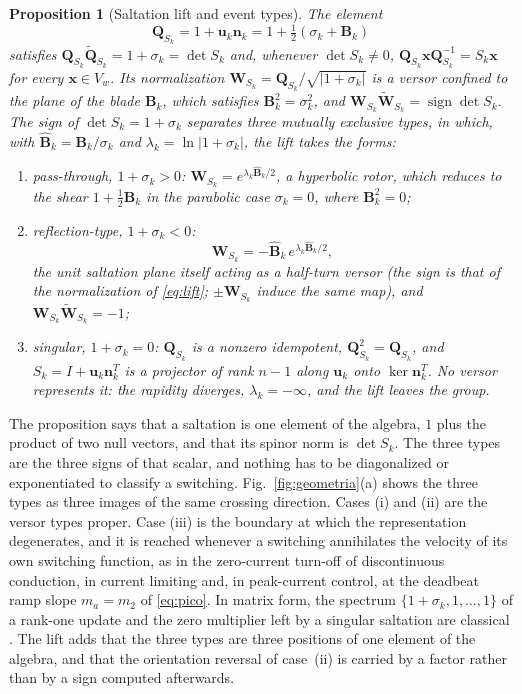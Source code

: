 \documentclass[journal]{IEEEtran}
\newtheorem{proposition}{Proposition}
\newcommand{\rev}[1]{\widetilde{#1}}
\newcommand{\sgn}{\operatorname{sign}}
\begin{document}
\begin{proposition}[Saltation lift and event types]
\label{prop:species}
The element
\begin{equation}
\bm{Q}_{S_k}=1+\bm{u}_k\bm{n}_k=1+\tfrac12(\sigma_k+\bm{B}_k)
\label{eq:lift}
\end{equation}
satisfies $\bm{Q}_{S_k}\rev{\bm{Q}}_{S_k}=1+\sigma_k=\det S_k$ and, whenever
$\det S_k\neq0$, $\bm{Q}_{S_k}\bm{x}\bm{Q}_{S_k}^{-1}=S_k\bm{x}$ for every
$\bm{x}\in V_w$. Its normalization
$\bm{W}_{S_k}=\bm{Q}_{S_k}/\sqrt{\lvert1+\sigma_k\rvert}$ is a versor confined
to the plane of the blade $\bm{B}_k$, which satisfies $\bm{B}_k^2=\sigma_k^2$,
and $\bm{W}_{S_k}\rev{\bm{W}}_{S_k}=\sgn\det S_k$. The sign of
$\det S_k=1+\sigma_k$ separates three mutually exclusive types, in which,
with $\hat{\bm{B}}_k=\bm{B}_k/\sigma_k$ and
$\lambda_k=\ln\lvert1+\sigma_k\rvert$, the lift takes the forms:
\begin{enumerate}
\item[(i)] pass-through, $1+\sigma_k>0$: $\bm{W}_{S_k}=e^{\lambda_k\hat{\bm{B}}_k/2}$,
a hyperbolic rotor, which reduces to the shear
$1+\tfrac12\bm{B}_k$ in the parabolic case $\sigma_k=0$, where
$\bm{B}_k^2=0$;
\item[(ii)] reflection-type, $1+\sigma_k<0$:
\begin{equation}
\bm{W}_{S_k}=-\hat{\bm{B}}_k\,e^{\lambda_k\hat{\bm{B}}_k/2},
\label{eq:halfturn}
\end{equation}
the unit saltation plane itself acting as a half-turn versor (the sign is
that of the normalization of \eqref{eq:lift}; $\pm\bm{W}_{S_k}$ induce the
same map), and $\bm{W}_{S_k}\rev{\bm{W}}_{S_k}=-1$;
\item[(iii)] singular, $1+\sigma_k=0$: $\bm{Q}_{S_k}$ is a nonzero idempotent,
$\bm{Q}_{S_k}^2=\bm{Q}_{S_k}$, and $S_k=I+\bm{u}_k\bm{n}_k^{T}$ is a projector
of rank $n-1$ along $\bm{u}_k$ onto $\ker \bm{n}_k^{T}$. No versor
represents it: the rapidity diverges, $\lambda_k=-\infty$, and the lift
leaves the group.
\end{enumerate}
\end{proposition}

The proposition says that a saltation is one element of the algebra, $1$
plus the product of two null vectors, and that its spinor norm is
$\det S_k$. The three types are the three signs of that scalar, and
nothing has to be diagonalized or exponentiated to classify a switching.
Fig.~\ref{fig:geometria}(a) shows the three types as three images of the
same crossing direction. Cases (i) and (ii) are the versor types proper.
Case (iii) is the boundary at which the representation degenerates, and it
is reached whenever a switching annihilates the velocity of its own
switching function, as in the zero-current turn-off of discontinuous
conduction, in current limiting and, in peak-current control, at the
deadbeat ramp slope $m_a=m_2$ of \eqref{eq:pico}. In matrix form, the
spectrum $\{1+\sigma_k,1,\dots,1\}$ of a rank-one update and the zero
multiplier left by a singular saltation are classical \cite{muller1995,kong2024saltation}. The
lift adds that the three types are three positions of one element of the
algebra, and that the orientation reversal of case~(ii) is carried by a
factor rather than by a sign computed afterwards.
\end{document}
